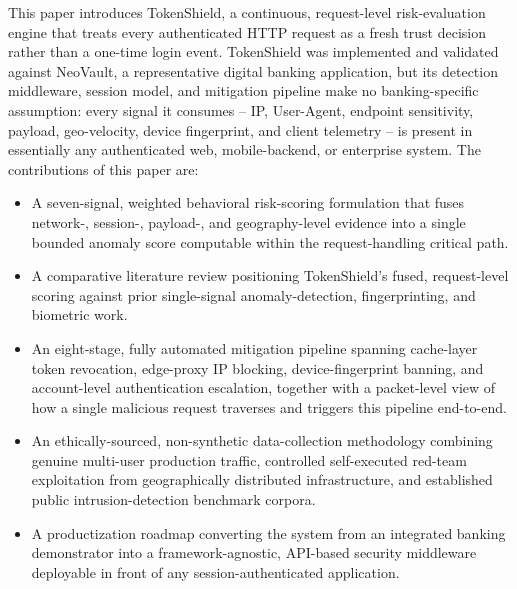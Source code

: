 \documentclass[conference]{IEEEtran}
\begin{document}
This paper introduces TokenShield, a continuous, request-level risk-evaluation engine that treats every authenticated HTTP request as a fresh trust decision rather than a one-time login event. TokenShield was implemented and validated against NeoVault, a representative digital banking application, but its detection middleware, session model, and mitigation pipeline make no banking-specific assumption: every signal it consumes -- IP, User-Agent, endpoint sensitivity, payload, geo-velocity, device fingerprint, and client telemetry -- is present in essentially any authenticated web, mobile-backend, or enterprise system. The contributions of this paper are:
\begin{itemize}
    \item A seven-signal, weighted behavioral risk-scoring formulation that fuses network-, session-, payload-, and geography-level evidence into a single bounded anomaly score computable within the request-handling critical path.
    \item A comparative literature review positioning TokenShield's fused, request-level scoring against prior single-signal anomaly-detection, fingerprinting, and biometric work.
    \item An eight-stage, fully automated mitigation pipeline spanning cache-layer token revocation, edge-proxy IP blocking, device-fingerprint banning, and account-level authentication escalation, together with a packet-level view of how a single malicious request traverses and triggers this pipeline end-to-end.
    \item An ethically-sourced, non-synthetic data-collection methodology combining genuine multi-user production traffic, controlled self-executed red-team exploitation from geographically distributed infrastructure, and established public intrusion-detection benchmark corpora.
    \item A productization roadmap converting the system from an integrated banking demonstrator into a framework-agnostic, API-based security middleware deployable in front of any session-authenticated application.
\end{itemize}

\end{document}

